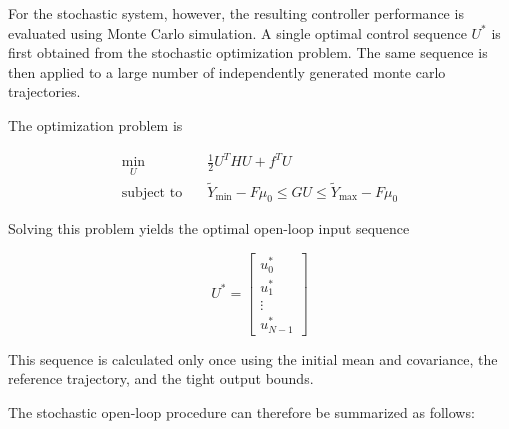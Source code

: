 For the stochastic system, however, the resulting controller performance is evaluated using Monte Carlo simulation. A single optimal control sequence \(U^\ast\) is first obtained from the stochastic optimization problem. The same sequence is then applied to a large number of independently generated monte carlo trajectories.

The optimization problem is

\begin{equation}
\begin{aligned}
    \min_U
    \quad &
    \frac{1}{2}U^THU+f^TU
    \\
    \text{subject to}
    \quad &
    \tilde{Y}_{\min}-F\mu_0
    \leq
    GU
    \leq
    \tilde{Y}_{\max}-F\mu_0
\end{aligned}
\end{equation}

Solving this problem yields the optimal open-loop input sequence

\begin{equation}
    U^\ast
    =
    \begin{bmatrix}
        u_0^\ast \\
        u_1^\ast \\
        \vdots \\
        u_{N-1}^\ast
    \end{bmatrix}
\end{equation}

This sequence is calculated only once using the initial mean and covariance, the reference trajectory, and the tight output bounds.

The stochastic open-loop procedure can therefore be summarized as follows:

